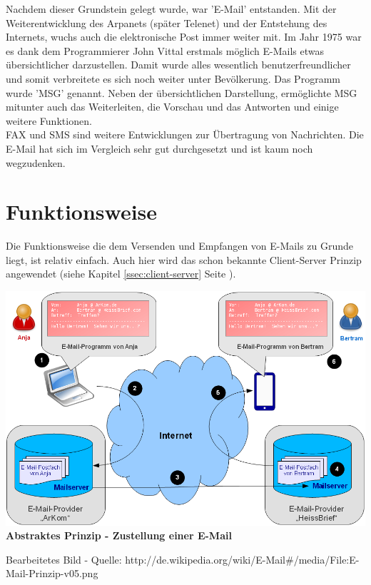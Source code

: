 \documentclass[12pt,a4paper]{report}
\begin{document}
\begin{onehalfspace}
Nachdem dieser Grundstein gelegt wurde, war 'E-Mail' entstanden. Mit der Weiterentwicklung des Arpanets (später Telenet) und der Entstehung des Internets, wuchs auch die elektronische Post immer weiter mit. Im Jahr 1975 war es dank dem Programmierer John Vittal erstmals möglich E-Mails etwas übersichtlicher darzustellen. Damit wurde alles wesentlich benutzerfreundlicher und somit verbreitete es sich noch weiter unter Bevölkerung. Das Programm wurde 'MSG' genannt. Neben der übersichtlichen Darstellung, ermöglichte MSG mitunter auch das Weiterleiten, die Vorschau und das Antworten und einige weitere Funktionen.\\

FAX und SMS sind weitere Entwicklungen zur Übertragung von Nachrichten. Die E-Mail hat sich im Vergleich sehr gut durchgesetzt und ist kaum noch wegzudenken. 
\section{Funktionsweise}
Die Funktionsweise die dem Versenden und Empfangen von E-Mails zu Grunde liegt, ist relativ einfach. Auch hier wird das schon bekannte Client-Server Prinzip angewendet (siehe Kapitel \ref{ssec:client-server} Seite \pageref{ssec:client-server}).\\

\begin{center}
\includegraphics[scale=0.6]{../docs/lyaton/graphics/E-Mail-Prinzip.png}\\
\textbf{Abstraktes Prinzip - Zustellung einer E-Mail}\\
\begin{scriptsize}
Bearbeitetes Bild - Quelle: http://de.wikipedia.org/wiki/E-Mail\#/media/File:E-Mail-Prinzip-v05.png
\end{scriptsize}
\end{center}
\vspace{0.5cm}


\end{onehalfspace}
\end{document}
